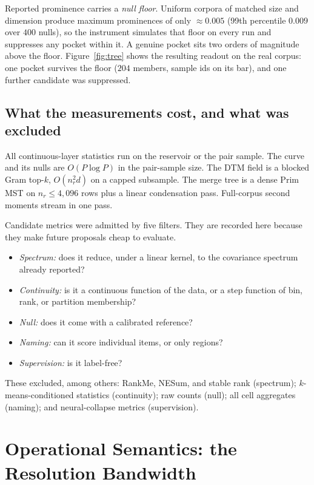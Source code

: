\documentclass[11pt,letterpaper]{article}
\begin{document}
Reported prominence carries a \emph{null floor}. Uniform corpora of
matched size and dimension produce maximum prominences of only
$\approx 0.005$ (99th percentile $0.009$ over $400$ nulls), so the
instrument simulates that floor on every run and suppresses any pocket
within it. A genuine pocket sits two orders of magnitude above the floor.
Figure~\ref{fig:tree} shows the resulting readout on the real corpus: one
pocket survives the floor ($204$ members, sample ids on its bar), and one
further candidate was suppressed.

\subsection{What the measurements cost, and what was excluded}
\label{sec:filters}

All continuous-layer statistics run on the reservoir or the pair sample.
The curve and its nulls are $O(P \log P)$ in the pair-sample size. The DTM
field is a blocked Gram top-$k$, $O(n_r^2 d)$ on a capped subsample.
The merge tree is a dense Prim MST on $n_r \le 4{,}096$
rows plus a linear condensation pass. Full-corpus second moments stream in
one pass.

Candidate metrics were admitted by five filters. They are recorded
here because they make future proposals cheap to evaluate.
\begin{itemize}
\item \emph{Spectrum:} does it reduce, under a linear kernel, to the
  covariance spectrum already reported?
\item \emph{Continuity:} is it a continuous function of the data, or
  a step function of bin, rank, or partition membership?
\item \emph{Null:} does it come with a calibrated reference?
\item \emph{Naming:} can it score individual items, or only regions?
\item \emph{Supervision:} is it label-free?
\end{itemize}
These excluded, among others: RankMe, NESum, and stable rank (spectrum);
$k$-means-conditioned statistics (continuity); raw counts (null); all
cell aggregates (naming); and neural-collapse metrics \cite{papyan2020}
(supervision).

\section{Operational Semantics: the Resolution Bandwidth}
\label{sec:semantics}
\end{document}
